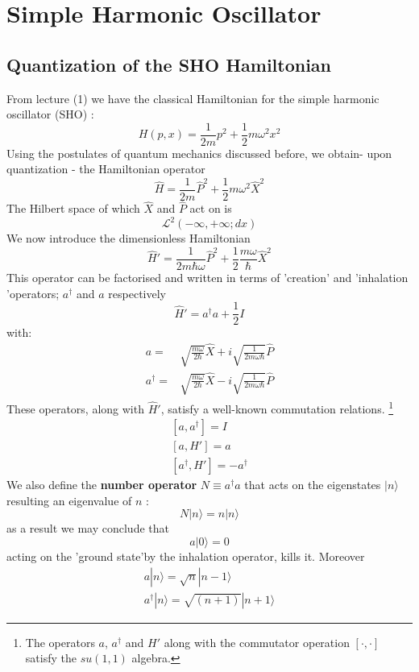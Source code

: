 \section{Simple Harmonic Oscillator}
\subsection{Quantization of the SHO Hamiltonian }
From lecture (1) we have the classical Hamiltonian for the simple harmonic oscillator (SHO) :
\begin{equation}
H(p,x)= \frac{1}{2m} p^2 +\frac{1}{2} m\omega^2x^2
\end{equation} 
Using the postulates of quantum mechanics discussed before, we obtain- upon quantization - the Hamiltonian operator 
\begin{equation}
\hat{H}= \frac{1}{2m} \hat{P}^2 +\frac{1}{2} m\omega^2\hat{X}^2
\end{equation}
The Hilbert space of which $\hat{X}$ and $\hat{P}$ act on is\[ \mathcal{L}^2 (-\infty,+\infty; dx)
\]
We now introduce the dimensionless Hamiltonian 
\begin{equation}
\hat{H}'= \frac{1}{2m \hbar \omega } \hat{P}^2 +\frac{1}{2} \frac{m \omega}{\hbar}\hat{X}^2
\end{equation}
This operator can be factorised and written in terms of 'creation' and 'inhalation 'operators; $ a^\dagger$ and $ a$ respectively 
\begin{equation}
\hat{H}'= a^\dagger a + \frac{1}{2} I
\end{equation}
with:
\begin{subequations}
	\begin{align}
	a = & \sqrt{\frac{m\omega}{2\hbar}} \hat{X}+ i \sqrt{\frac{1}{2m\omega \hbar}} \hat{P}\\
	a^\dagger = & \sqrt{\frac{m\omega}{2\hbar}} \hat{X}- i \sqrt{\frac{1}{2m\omega \hbar}} \hat{P}
	\end{align}
\end{subequations}
These operators, along with $\hat{H}'$, satisfy a well-known commutation relations. \footnote{ The operators $a$, $a^\dagger$ and $ H'$ along with the commutator operation $[ \cdot,\cdot]$ satisfy the $su(1,1)$ algebra.}
\begin{subequations}
	\begin{gather}
	[ a, a^\dagger] = I \\
	[a,H'] = a \\
	[a^\dagger,H'] = -a ^\dagger 
	\end{gather}
\end{subequations}
We also define the \textbf{number operator} $ N \equiv a^\dagger a$ that acts on the eigenstates $ |n\rangle$ resulting an eigenvalue of $n$ :
\[
N | n\rangle = n |n\rangle
\]
as a result we may conclude that 
\begin{equation}
a |0\rangle = 0 
\label{inh}
\end{equation}
acting on the 'ground state'by the inhalation operator, kills it.  Moreover 
\begin{gather}
a |n\rangle = \sqrt{n} | n-1\rangle \\
a^\dagger |n\rangle = \sqrt{(n+1)} | n+1\rangle
\end{gather}

